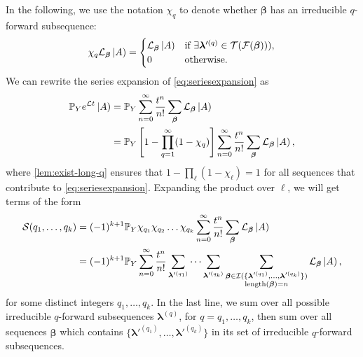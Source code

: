 In the following, we use the notation $\chi_q$ to denote whether $\bm \beta$ has an irreducible $q$-forward subsequence:
\begin{align}
	\chi_q \mathcal{L}_{\bm \beta} \left | A \right) =
	\begin{cases}
	\mathcal{L}_{\bm \beta} \left | A \right) &\text{if } \exists \bm \lambda'^{(q)} \in \mathcal T(\mathcal F(\bm\beta))),\\
	0 &\text{otherwise.}
	\end{cases}
\end{align}
We can rewrite the series expansion of \cref{eq:seriesexpansion} as
\begin{align}
	\mathbb{P}_Y e^{\mathcal{L} t}\left | A \right) &= \mathbb{P}_Y \sum_{n=0}^{\infty} \frac{t^n}{n!} \sum_{\bm \beta }\mathcal{L}_{\bm \beta} \left | A \right)\\
	&= \mathbb{P}_Y \left[1-\prod_{q=1}^\infty(1-\chi_q)\right]\sum_{n=0}^{\infty} \frac{t^n}{n!} \sum_{\bm \beta }\mathcal{L}_{\bm \beta} \left | A \right),\label{eq:expandchi}
\end{align}
where \cref{lem:exist-long-q} ensures that $1-\prod_{\ell}(1-\chi_\ell) = 1$ for all sequences that contribute to \cref{eq:seriesexpansion}.
Expanding the product over $\ell$, we will get terms of the form
\begin{align}
\mathcal S(q_1,\dots,q_k) &= (-1)^{k+1}\mathbb{P}_Y \chi_{q_1}\chi_{q_2}\dots\chi_{q_k}\sum_{n=0}^{\infty} \frac{t^n}{n!} \sum_{\bm \beta }\mathcal{L}_{\bm \beta} \left | A \right)\\
&=(-1)^{k+1}\mathbb{P}_Y \sum_{n=0}^{\infty} \frac{t^n}{n!} \sum_{\bm \lambda'^{(q_1)}} \dots\sum_{\bm \lambda'^{(q_k)}}
\sum_{\substack{\bm\beta\in\mathcal I(\{\bm\lambda'^{(q_1)},\dots,\bm\lambda'^{(q_k)}\})\\
\text{length}(\bm\beta) = n
}}
\mathcal{L}_{\bm \beta} \left | A \right),
\end{align}
for some distinct integers $q_1,\dots,q_k$.
In the last line, we sum over all possible irreducible $q$-forward subsequences $\bm \lambda^{(q)}$, for $q = q_1,\dots,q_k$, then sum over all sequences $\bm \beta$ which contains $\{\bm\lambda'^{(q_1)},\dots,\bm\lambda'^{(q_k)}\}$ in its set of irreducible $q$-forward subsequences.

